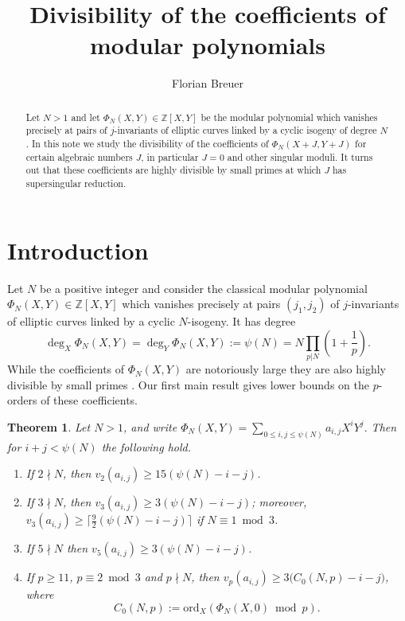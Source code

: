 \documentclass[11pt]{amsart}
\newtheorem{thm}[prop]{Theorem}
\theoremstyle{definition}
\newcommand{\ord}{\mathrm{ord}}
\def\BZ{\mathbb{Z}}
\begin{document}
\title[Divisibility of the coefficients of modular polynomials]{Divisibility of the coefficients of modular polynomials}

\author{Florian Breuer}
\address{School of Computer and Information Sciences, University of Newcastle, Callaghan, NSW 2308, Australia}


\begin{abstract}
    Let $N>1$ and let $\Phi_N(X,Y)\in\mathbb{Z}[X,Y]$ be the modular polynomial which vanishes precisely at pairs of $j$-invariants of elliptic curves linked by a cyclic isogeny of degree $N$. In this note we study the divisibility of the coefficients of $\Phi_N(X+J, Y+J)$ for certain algebraic numbers $J$, in particular $J=0$ and other singular moduli. It turns out that these coefficients are highly divisible by small primes at which $J$ has supersingular reduction.
\end{abstract}

\maketitle

\section{Introduction}

Let $N$ be a positive integer and consider the classical modular polynomial $\Phi_N(X,Y)\in\BZ[X,Y]$
which vanishes precisely at pairs $(j_1,j_2)$ of $j$-invariants of elliptic curves linked by a cyclic $N$-isogeny. It has degree 
\[
\deg_X\Phi_N(X,Y) = \deg_Y\Phi_N(X,Y) := \psi(N) = N\prod_{p|N}\left(1+\frac{1}{p}\right).
\]
While the coefficients of $\Phi_N(X,Y)$ are notoriously large \cite{BPG2025, BP2024,  BS2010, Cohen1984} they are also highly divisible by small primes \cite{WANG202614}. 
Our first main result gives lower bounds on the $p$-orders of these coefficients.

\begin{thm}
	\label{thm:main}
    Let $N > 1$, and write 
    $\Phi_N(X,Y) = \sum_{0\leq i,j \leq \psi(N)}a_{i,j}X^iY^j.$
    Then for $i+j < \psi(N)$ the following hold.
    \begin{enumerate}
        \item If $2\nmid N$, then $v_2(a_{i,j}) \geq 15(\psi(N) -i -j)$.
        \item If $3\nmid N$, then $v_3(a_{i,j}) \geq 3(\psi(N) -i -j)$; moreover, 
        $v_3(a_{i,j}) \geq \lceil\frac{9}{2}(\psi(N) -i -j)\rceil$
        if $N\equiv 1 \bmod 3$.
        \item If $5\nmid N$ then
        $v_5(a_{i,j}) \geq 3(\psi(N) -i -j)$.
        \item If $p \geq 11$, $p \equiv 2 \bmod 3$ and $p\nmid N$, then $v_p(a_{i,j}) \geq 3\big(C_0(N,p)-i-j\big)$,
        where\
        \[
        C_0(N,p) := \ord_X (\Phi_N(X,0) \bmod p).
        \]
    \end{enumerate}
\end{thm}
\end{document}
